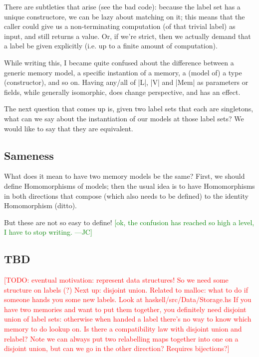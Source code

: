 \documentclass{jfp}
\newcommand{\authornote}[3]{\textcolor{#1}{[#3 ---#2]}}
\newcommand{\todo}[1]{\textcolor{red}{[TODO: #1]}}
\newcommand{\authornote}[3]{}
\newcommand{\todo}[1]{}
\newcommand{\jc}[1]{\authornote{green}{JC}{#1}}  %
\begin{document}
There are subtleties that arise (see the bad code): because the label
set has a unique constructore, we can be lazy about matching on it;
this means that the caller could give us a non-terminating computation
(of that trivial label) as input, and still 
returns a value. Or, if we're strict, then we actually demand that
a label be given explicitly (i.e. up to a finite amount of computation).

\begin{commentary}
While writing this, I became quite confused about the difference between
a generic memory model, a specific instantion of a memory, a (model of)
a type (constructor), and so on.  Having any/all of |L|, |V| and 
|Mem| as parameters or fields, while generally isomorphic, does change
perspective, and has an effect.
\end{commentary}

The next question that comes up is, given two label sets that each
are singletons, what can we say about the instantiation of our models
at those label sets?  We would like to say that they are equivalent.

\subsection{Sameness}

What does it mean to have two memory models be the same?  First, we
should define Homomorphisms of models; then the usual idea is to
have Homomorphisms in both directions that compose (which also needs
to be defined) to the identity Homomorphism (ditto).

But these are not so easy to define! \jc{ok, the confusion has reached
so high a level, I have to stop writing.}

\subsection{TBD}

\todo{eventual motivation: represent data structures!  So we need some
  structure on labels (?)  Next up: disjoint union.  Related to
  malloc: what to do if someone hands you some new labels.  Look at
  haskell/src/Data/Storage.hs If you have two memories and want to put
  them together, you definitely need disjoint union of label sets:
  otherwise when handed a label there's no way to know which memory to
  do lookup on.  Is there a compatibility law with disjoint union and
  relabel?  Note we can always put two relabelling maps together into
  one on a disjoint union, but can we go in the other direction?
  Requires bijections?}
\end{document}
